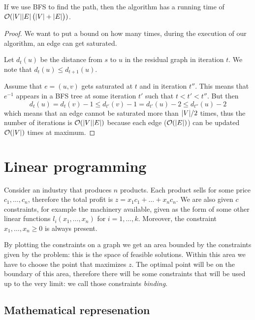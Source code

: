 \documentclass[14pt]{extarticle}
\begin{document}
\begin{theorem}
    If we use BFS to find the path, then the algorithm has a running time of $\mathcal{O}(\abs{V} \abs{E} \left( \abs{V} + \abs{E} \right))$.
\end{theorem}

\begin{proof}
    We want to put a bound on how many times, during the execution of our algorithm, an edge can get saturated.

    Let $d_t(u)$ be the distance from $s$ to $u$ in the residual graph in iteration $t$.
    We note that $d_t(u) \leq d_{t+1}(u)$.

    Assume that $e = (u, v)$ gets saturated at $t$ and in iteration $t''$.
    This means that $e^{-1}$ appears in a BFS tree at some iteration $t'$ such that $t < t' < t''$.
    But then
    \begin{equation}
        d_t(u) = d_t(v)-1 \leq d_{t'}(v)-1 = d_{t'}(u)-2 \leq d_{t''}(u)-2
    \end{equation}
    which means that an edge cannot be saturated more than $\abs{V}/2$ times,
    thus the number of iterations is $\mathcal{O}(\abs{V}\abs{E})$ because each edge ($\mathcal{O}(\abs{E})$) can be updated $\mathcal{O}(\abs{V})$ times at maximum.
\end{proof}

\section{Linear programming}

Consider an industry that produces $n$ products.
Each product sells for some price $c_1, \ldots, c_n$, therefore the total profit is $z = x_1 c_1 + \dots + x_n c_n$.
We are also given $c$ constraints, for example the machinery available, given as the form of some other linear functions $l_i(x_1, \ldots, x_n)$ for $i = 1, \ldots, k$.
Moreover, the constraint $x_1, \ldots, x_n \geq 0$ is always present.

By plotting the constraints on a graph we get an area bounded by the constraints given by the problem: this is the space of feasible solutions.
Within this area we have to choose the point that maximizes $z$.
The optimal point will be on the boundary of this area, therefore there will be some constraints that will be used up to the very limit: we call those  constraints \textit{binding}.

\subsection{Mathematical represenation}
\end{document}
